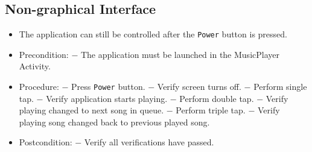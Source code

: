 \subsection{Non-graphical Interface}
{ }
{\begin{itemize}
\item The application can still be controlled after the \texttt{Power} button is pressed.
\end{itemize}}
{\begin{itemize}
\item Precondition: 
\subitem $-$ The application must be launched in the MusicPlayer Activity.

\item Procedure:
\subitem $-$ Press \texttt{Power} button.
\subitem $-$ Verify screen turns off.
\subitem $-$ Perform single tap.
\subitem $-$ Verify application starts playing.
\subitem $-$ Perform double tap.
\subitem $-$ Verify playing changed to next song in queue.
\subitem $-$ Perform triple tap.
\subitem $-$ Verify playing song changed back to previous played song.

\item Postcondition:
\subitem $-$ Verify all verifications have passed.
\end{itemize}}